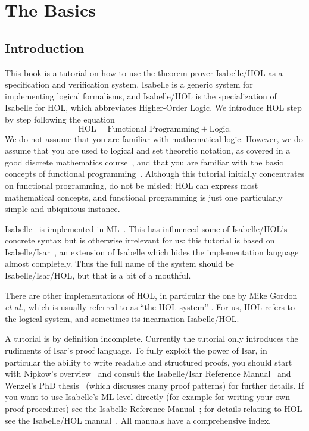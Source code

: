 \chapter{The Basics}

\section{Introduction}

This book is a tutorial on how to use the theorem prover Isabelle/HOL as a
specification and verification system. Isabelle is a generic system for
implementing logical formalisms, and Isabelle/HOL is the specialization
of Isabelle for HOL, which abbreviates Higher-Order Logic. We introduce
HOL step by step following the equation
\[ \mbox{HOL} = \mbox{Functional Programming} + \mbox{Logic}. \]
We do not assume that you are familiar with mathematical logic. 
However, we do assume that
you are used to logical and set theoretic notation, as covered
in a good discrete mathematics course~\cite{Rosen-DMA}, and
that you are familiar with the basic concepts of functional
programming~\cite{Bird-Haskell,Hudak-Haskell,paulson-ml2,Thompson-Haskell}.
Although this tutorial initially concentrates on functional programming, do
not be misled: HOL can express most mathematical concepts, and functional
programming is just one particularly simple and ubiquitous instance.

Isabelle~\cite{paulson-isa-book} is implemented in ML~\cite{SML}.  This has
influenced some of Isabelle/HOL's concrete syntax but is otherwise irrelevant
for us: this tutorial is based on
Isabelle/Isar~\cite{isabelle-isar-ref}, an extension of Isabelle which hides
the implementation language almost completely.  Thus the full name of the
system should be Isabelle/Isar/HOL, but that is a bit of a mouthful.

There are other implementations of HOL, in particular the one by Mike Gordon
%
\emph{et al.}, which is usually referred to as ``the HOL system''
\cite{mgordon-hol}. For us, HOL refers to the logical system, and sometimes
its incarnation Isabelle/HOL\@.

A tutorial is by definition incomplete.  Currently the tutorial only
introduces the rudiments of Isar's proof language. To fully exploit the power
of Isar, in particular the ability to write readable and structured proofs,
you should start with Nipkow's overview~\cite{Nipkow-TYPES02} and consult
the Isabelle/Isar Reference Manual~\cite{isabelle-isar-ref} and Wenzel's
PhD thesis~\cite{Wenzel-PhD} (which discusses many proof patterns)
for further details. If you want to use Isabelle's ML level
directly (for example for writing your own proof procedures) see the Isabelle
Reference Manual~\cite{isabelle-ref}; for details relating to HOL see the
Isabelle/HOL manual~\cite{isabelle-HOL}. All manuals have a comprehensive
index.


